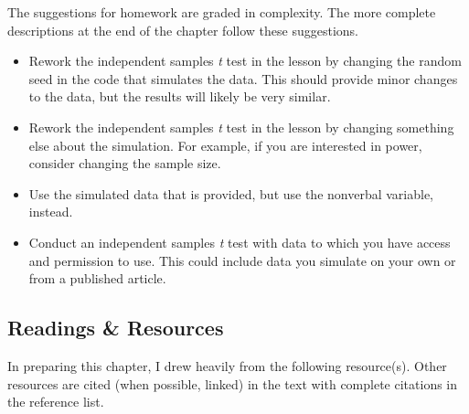 \documentclass[
  11pt,
]{book}
\providecommand{\tightlist}{%
  \setlength{\itemsep}{0pt}\setlength{\parskip}{0pt}}
\begin{document}
The suggestions for homework are graded in complexity. The more complete descriptions at the end of the chapter follow these suggestions.

\begin{itemize}
\tightlist
\item
  Rework the independent samples \emph{t} test in the lesson by changing the random seed in the code that simulates the data. This should provide minor changes to the data, but the results will likely be very similar.
\item
  Rework the independent samples \emph{t} test in the lesson by changing something else about the simulation. For example, if you are interested in power, consider changing the sample size.
\item
  Use the simulated data that is provided, but use the nonverbal variable, instead.
\item
  Conduct an independent samples \emph{t} test with data to which you have access and permission to use. This could include data you simulate on your own or from a published article.
\end{itemize}

\hypertarget{readings-resources-2}{%
\subsection{Readings \& Resources}\label{readings-resources-2}}

In preparing this chapter, I drew heavily from the following resource(s). Other resources are cited (when possible, linked) in the text with complete citations in the reference list.
\end{document}
